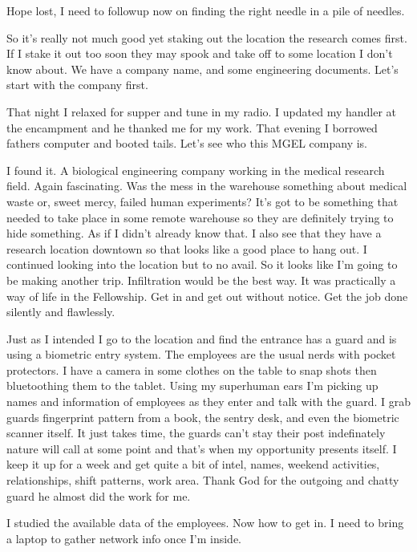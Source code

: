 Hope lost, I need to followup now on finding the right needle in a pile of needles.

So it's really not much good yet staking out the location the research comes first. If I stake it out too soon they may spook and take off to some location I don't know about. We have a company name, and some engineering documents. Let's start with the company first.

That night I relaxed for supper and tune in my radio. I updated my handler at the encampment and he thanked me for my work. That evening I borrowed fathers computer and booted tails. Let's see who this MGEL company is.

I found it. A biological engineering company working in the medical research field. Again fascinating. Was the mess in the warehouse something about medical waste or, sweet mercy, failed human experiments? It's got to be something that needed to take place in some remote warehouse so they are definitely trying to hide something. As if I didn't already know that. I also see that they have a research location downtown so that looks like a good place to hang out.
I continued looking into the location but to no avail.
So it looks like I'm going to be making another trip.
Infiltration would be the best way. It was practically a way of life in the Fellowship. Get in and get out without notice. Get the job done silently and flawlessly.

Just as I intended I go to the location and find the entrance has a guard and is using a biometric entry system. The employees are the usual nerds with pocket protectors. I have a camera in some clothes on the table to snap shots then bluetoothing them to the tablet. Using my superhuman ears I'm picking up names and information of employees as they enter and talk with the guard. I grab guards fingerprint pattern from a book, the sentry desk, and even the biometric scanner itself. It just takes time, the guards can't stay their post indefinately nature will call at some point and that's when my opportunity presents itself. I keep it up for a week and get quite a bit of intel, names, weekend activities, relationships, shift patterns, work area. Thank God for the outgoing and chatty guard he almost did the work for me.

I studied the available data of the employees. Now how to get in. I need to bring a laptop to gather network info once I'm inside.

